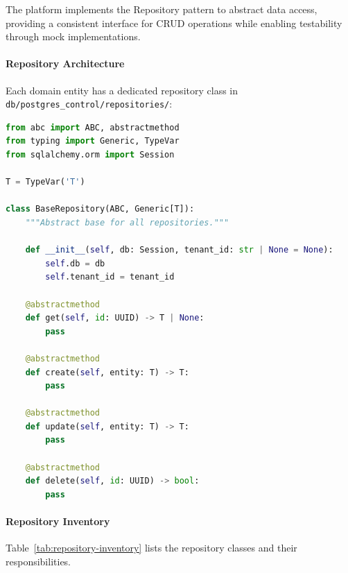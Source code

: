 The platform implements the Repository pattern to abstract data access, providing a consistent interface for CRUD operations while enabling testability through mock implementations.

\paragraph{Repository Architecture}
Each domain entity has a dedicated repository class in \texttt{db/postgres\_control/repositories/}:

\begin{lstlisting}[language=Python, caption={Repository base class and implementation pattern.}]
from abc import ABC, abstractmethod
from typing import Generic, TypeVar
from sqlalchemy.orm import Session

T = TypeVar('T')

class BaseRepository(ABC, Generic[T]):
    """Abstract base for all repositories."""
    
    def __init__(self, db: Session, tenant_id: str | None = None):
        self.db = db
        self.tenant_id = tenant_id
    
    @abstractmethod
    def get(self, id: UUID) -> T | None:
        pass
    
    @abstractmethod
    def create(self, entity: T) -> T:
        pass
    
    @abstractmethod
    def update(self, entity: T) -> T:
        pass
    
    @abstractmethod
    def delete(self, id: UUID) -> bool:
        pass
\end{lstlisting}

\paragraph{Repository Inventory}
Table~\ref{tab:repository-inventory} lists the repository classes and their responsibilities.

